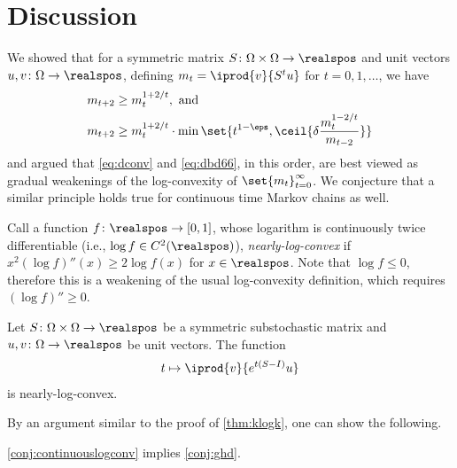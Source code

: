 \section{Discussion}
\label{sec:discussion}
We showed that for a symmetric matrix 
$S\colon\Omega\times\Omega\to\realspos$ and 
unit vectors $u,v\colon\Omega\to\realspos$, defining
$m_t = \iprod{v}{S^tu}$ for $t=0,1,\ldots$, we have 
\begin{align}
m_{t+2}    &\ge m_t^{1+2/t}, \text{ and}\label{eq:dbd66}\\
m_{t+2}    &\ge m_t^{1+2/t}\cdot \min\set{t^{1-\eps}, 
\ceil{\delta\frac{m_t^{1-2/t}}{m_{t-2}}}} \label{eq:dconv}
\end{align}
and argued that \autoref{eq:dconv} and \eqref{eq:dbd66}, 
in this order, are best viewed as gradual weakenings of
the log-convexity of $\set{m_t}_{t=0}^\infty$.
We conjecture that a similar principle holds
true for continuous time Markov chains as well.

Call a function $f\colon\realspos\to[0,1]$,
whose logarithm is continuously twice differentiable 
(i.e., $\log f\in C^2(\realspos)$), {\em nearly-log-convex} 
if $x^2 (\log f)''(x)\ge 2 \log f(x)$ for $x\in\realspos$. 
Note that $\log f \le 0$, therefore this is a weakening
of the usual log-convexity definition, which requires 
$(\log f)''\ge 0$.

\begin{conjecture}
\label{conj:continuouslogconv}
Let $S\colon\Omega\times\Omega\to\realspos$
be a symmetric substochastic matrix and $u,v\colon\Omega\to\realspos$
be unit vectors. The function
\begin{align*}
t\mapsto \iprod{v}{e^{t(S-I)}u}
\end{align*}
is nearly-log-convex.
\end{conjecture}
By an argument similar to the proof of \autoref{thm:klogk}, one can 
show the following.
\begin{theorem}
\autoref{conj:continuouslogconv} implies \autoref{conj:ghd}.
\end{theorem}

